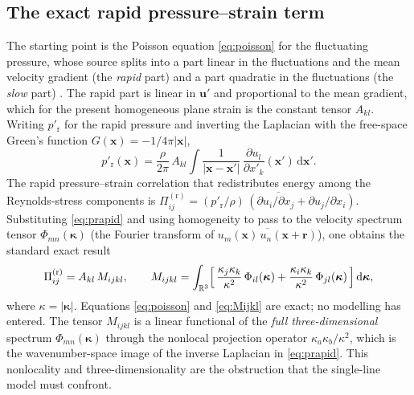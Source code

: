 \documentclass[lineno]{JFM-FLM_Au}
\begin{document}
\subsection{The exact rapid pressure--strain term}\label{sec:exact-pi}

The starting point is the Poisson equation \eqref{eq:poisson} for the
fluctuating pressure, whose source splits into a part linear in the
fluctuations and the mean velocity gradient (the \emph{rapid} part) and a
part quadratic in the fluctuations (the \emph{slow} part)
\citep{Pope2000}. The rapid part is linear in $\boldsymbol{u}'$ and
proportional to the mean gradient, which for the present homogeneous
plane strain is the constant tensor $A_{kl}$. Writing
$p'_{\mathrm r}$ for the rapid pressure and inverting the Laplacian with the
free-space Green's function $G(\boldsymbol{x})=-1/4\pi|\boldsymbol{x}|$,
\begin{equation}
  p'_{\mathrm r}(\boldsymbol{x})
  = \frac{\rho}{2\pi}\,A_{kl}\!\int
    \frac{1}{|\boldsymbol{x}-\boldsymbol{x}'|}\,
    \frac{\partial u_l}{\partial x'_k}(\boldsymbol{x}')\,
    \mathrm{d}\boldsymbol{x}' .
  \label{eq:prapid}
\end{equation}
The rapid pressure--strain correlation that redistributes energy among the
Reynolds-stress components is
$\Pi^{(\mathrm r)}_{ij}
   = \overline{(p'_{\mathrm r}/\rho)\,(\partial u_i/\partial x_j
     + \partial u_j/\partial x_i)}$.
Substituting \eqref{eq:prapid} and using homogeneity to pass to the
velocity spectrum tensor
$\Phi_{mn}(\boldsymbol{\kappa})$
(the Fourier transform of $\overline{u_m(\boldsymbol{x})\,
u_n(\boldsymbol{x}+\boldsymbol{r})}$),
one obtains the standard exact result
\citep{BatchelorProudman1954,Crow1968,HuntCarruthers1990}
\begin{equation}
  \Pi^{(\mathrm r)}_{ij}
  = A_{kl}\,M_{ijkl},
  \qquad
  M_{ijkl}
  = \int_{\mathbb{R}^3}
    \Bigl[\,
      \frac{\kappa_j\kappa_k}{\kappa^2}\,\Phi_{il}(\boldsymbol{\kappa})
      + \frac{\kappa_i\kappa_k}{\kappa^2}\,\Phi_{jl}(\boldsymbol{\kappa})
    \,\Bigr]\,\mathrm{d}\boldsymbol{\kappa},
  \label{eq:Mijkl}
\end{equation}
where $\kappa=|\boldsymbol{\kappa}|$. Equations
\eqref{eq:poisson} and \eqref{eq:Mijkl} are exact; no modelling has entered. The
tensor $M_{ijkl}$ is a linear functional of the \emph{full three-dimensional}
spectrum $\Phi_{mn}(\boldsymbol{\kappa})$ through the nonlocal projection
operator $\kappa_a\kappa_b/\kappa^2$, which is the wavenumber-space image of
the inverse Laplacian in \eqref{eq:prapid}. This nonlocality and
three-dimensionality are the obstruction that the single-line model must
confront.
\end{document}
